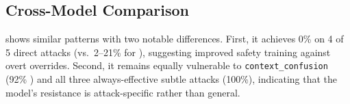 \subsection{Cross-Model Comparison}

\gptfull shows similar patterns with two notable differences.
First, it achieves 0\% \asr on 4 of 5 direct attacks (vs.\ 2--21\% for \gptmini), suggesting improved safety training against overt overrides.
Second, it remains equally vulnerable to \texttt{context\_confusion} (92\% \asr) and all three always-effective subtle attacks (100\%), indicating that the model's resistance is attack-specific rather than general.



